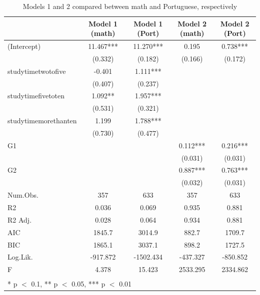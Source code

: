 \documentclass[12pt,english]{article}
\begin{document}
\begin{table}
\centering
\caption{Models 1 and 2 compared between math and Portuguese, respectively}
\label{tab:comparison}
\begin{tabular}[t]{lcccc}
\toprule
  & Model 1 (math) & Model 1 (Port) & Model 2 (math) & Model 2 (Port)\\
\midrule
(Intercept) & 11.467*** & 11.270*** & 0.195 & 0.738***\\
 & (0.332) & (0.182) & (0.166) & (0.172)\\
studytimetwotofive & -0.401 & 1.111*** &  & \\
 & (0.407) & (0.237) &  & \\
studytimefivetoten & 1.092** & 1.957*** &  & \\
 & (0.531) & (0.321) &  & \\
studytimemorethanten & 1.199 & 1.788*** &  & \\
 & (0.730) & (0.477) &  & \\
G1 &  &  & 0.112*** & 0.216***\\
 &  &  & (0.031) & (0.031)\\
G2 &  &  & 0.887*** & 0.763***\\
 &  &  & (0.032) & (0.031)\\
\midrule
Num.Obs. & 357 & 633 & 357 & 633\\
R2 & 0.036 & 0.069 & 0.935 & 0.881\\
R2 Adj. & 0.028 & 0.064 & 0.934 & 0.881\\
AIC & 1845.7 & 3014.9 & 882.7 & 1709.7\\
BIC & 1865.1 & 3037.1 & 898.2 & 1727.5\\
Log.Lik. & -917.872 & -1502.434 & -437.327 & -850.852\\
F & 4.378 & 15.423 & 2533.295 & 2334.862\\
\bottomrule
\multicolumn{5}{l}{\textsuperscript{} * p $<$ 0.1, ** p $<$ 0.05, *** p $<$ 0.01}\\
\end{tabular}
\end{table}
\end{document}
